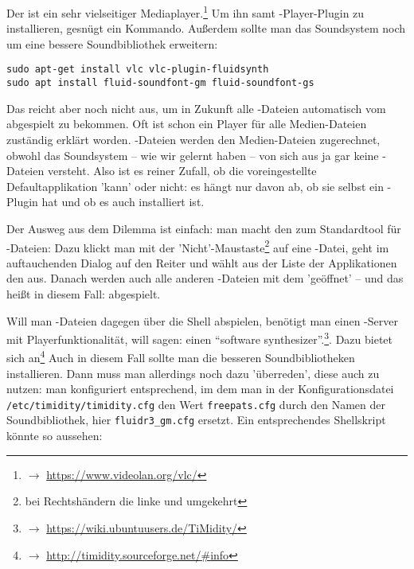 Der  ist ein sehr vielseitiger Mediaplayer.\footnote{$\rightarrow$
\href{https://www.videolan.org/vlc/}{https://www.videolan.org/vlc/}} Um ihn samt
-Player-Plugin zu installieren, gesnügt ein Kommando. Außerdem sollte
man das Soundsystem noch um eine bessere Soundbibliothek erweitern:

\begin{verbatim}
sudo apt-get install vlc vlc-plugin-fluidsynth
sudo apt install fluid-soundfont-gm fluid-soundfont-gs
\end{verbatim}

Das reicht aber noch nicht aus, um in Zukunft alle -Dateien
automatisch vom  abgespielt zu bekommen. Oft ist schon ein Player für
alle Medien-Dateien zuständig erklärt worden. -Dateien werden den
Medien-Dateien zugerechnet, obwohl das Soundsystem -- wie wir gelernt haben --
von sich aus ja gar keine -Dateien versteht. Also ist es reiner
Zufall, ob die voreingestellte Defaultapplikation  'kann' oder nicht:
es hängt nur davon ab, ob sie selbst ein -Plugin hat und ob es auch
installiert ist.

Der Ausweg aus dem Dilemma ist einfach: man macht den  zum Standardtool
für -Dateien: Dazu klickt man mit der 'Nicht'-Maustaste\footnote{bei
Rechtshändern die linke und umgekehrt} auf eine -Datei, geht im
auftauchenden Dialog auf den Reiter  und wählt aus der Liste der
Applikationen den   aus. Danach werden auch alle anderen
-Dateien mit dem   'geöffnet' -- und das heißt in diesem
Fall: abgespielt.

Will man -Dateien dagegen über die Shell abspielen, benötigt man einen
-Server mit Playerfunktionalität, will sagen: einen \enquote{software
synthesizer}.\footnote{$\rightarrow$
\href{https://wiki.ubuntuusers.de/TiMidity/}{https://wiki.ubuntuusers.de/TiMidity/}}.
Dazu bietet sich  an\footnote{$\rightarrow$
\href{http://timidity.sourceforge.net/{\#}info}{http://timidity.sourceforge.net/{\#}info}}
Auch in diesem Fall sollte man die besseren Soundbibliotheken installieren. Dann
muss man  allerdings noch dazu 'überreden', diese auch zu nutzen:
man konfiguriert  entsprechend, im dem man in der
Konfigurationsdatei \texttt{/etc/timidity/timidity.cfg} den Wert
\texttt{freepats.cfg} durch den Namen der Soundbibliothek, hier
\texttt{fluidr3\_gm.cfg} ersetzt. Ein entsprechendes Shellskript könnte so
aussehen:

